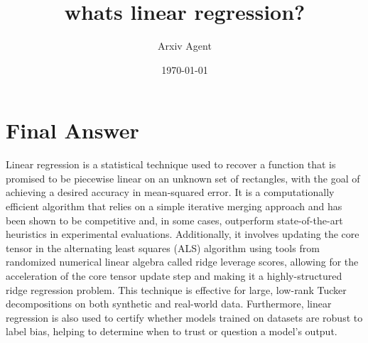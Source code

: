 \documentclass{article}%
\title{whats linear regression?}%
\author{Arxiv Agent}%
\date{\today}%
\begin{document}
%
\normalsize%
\maketitle%
\section{Final Answer}%
\label{sec:FinalAnswer}%
Linear regression is a statistical technique used to recover a function that is promised to be piecewise linear on an unknown set of rectangles, with the goal of achieving a desired accuracy in mean{-}squared error. It is a computationally efficient algorithm that relies on a simple iterative merging approach and has been shown to be competitive and, in some cases, outperform state{-}of{-}the{-}art heuristics in experimental evaluations. Additionally, it involves updating the core tensor in the alternating least squares (ALS) algorithm using tools from randomized numerical linear algebra called ridge leverage scores, allowing for the acceleration of the core tensor update step and making it a highly{-}structured ridge regression problem. This technique is effective for large, low{-}rank Tucker decompositions on both synthetic and real{-}world data. Furthermore, linear regression is also used to certify whether models trained on datasets are robust to label bias, helping to determine when to trust or question a model's output.

%
\end{document}

